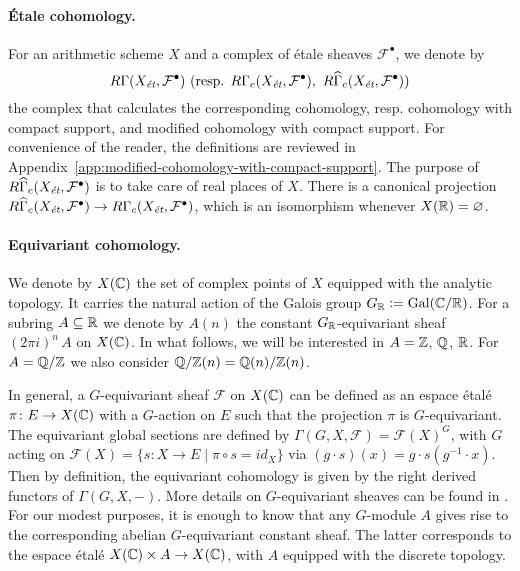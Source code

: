 \documentclass{article}
\numberwithin{equation}{section}
\begin{document}
\paragraph{Étale cohomology.}
For an arithmetic scheme $X$ and a complex of étale sheaves
$\mathcal{F}^\bullet$, we denote by
\[ R\Gamma (X_\et, \mathcal{F}^\bullet) ~
\text{(resp. }R\Gamma_c (X_\et, \mathcal{F}^\bullet), ~
R\widehat{\Gamma}_c (X_\et, \mathcal{F}^\bullet)\text{)} \]
the complex that calculates the corresponding cohomology, resp. cohomology with
compact support, and modified cohomology with compact support. For convenience
of the reader, the definitions are reviewed in
Appendix~\ref{app:modified-cohomology-with-compact-support}. The purpose of
$R\widehat{\Gamma}_c (X_\et, \mathcal{F}^\bullet)$ is to take care of real
places of $X$. There is a canonical projection
$R\widehat{\Gamma}_c (X_\et, \mathcal{F}^\bullet) \to R\Gamma_c (X_\et, \mathcal{F}^\bullet)$,
which is an isomorphism whenever $X (\RR) = \emptyset$.

\paragraph{Equivariant cohomology.}
We denote by $X (\CC)$ the set of complex points of $X$ equipped with the
analytic topology. It carries the natural action of the Galois group
$G_\RR \dfn \Gal (\CC/\RR)$. For a subring $A \subseteq \RR$ we denote by
$A (n)$ the constant $G_\RR$-equivariant sheaf $(2\pi i)^n \, A$ on
$X (\CC)$. In what follows, we will be interested in $A = \ZZ$, $\QQ$, $\RR$.
For $A = \QQ/\ZZ$ we also consider $\QQ/\ZZ (n) = \QQ (n)/\ZZ (n)$.

In general, a $G$-equivariant sheaf $\mathcal{F}$ on $X (\CC)$ can be defined as
an espace étalé $\pi\colon E\to X (\CC)$ with a $G$-action on $E$ such that the
projection $\pi$ is $G$-equivariant. The equivariant global sections are defined
by $\Gamma (G,X,\mathcal{F}) = \mathcal{F} (X)^G$, with $G$ acting on
$\mathcal{F} (X) = \{ s\colon X\to E \mid \pi\circ s = id_X \}$ via
$(g\cdot s) (x) = g\cdot s (g^{-1}\cdot x)$. Then by definition, the equivariant
cohomology is given by the right derived functors of $\Gamma (G,X,-)$. More
details on $G$-equivariant sheaves can be found in
\cite[Chapitre~2]{Morin-these}. For our modest purposes, it is enough to know
that any $G$-module $A$ gives rise to the corresponding abelian $G$-equivariant
constant sheaf. The latter corresponds to the espace étalé
$X (\CC)\times A \to X (\CC)$, with $A$ equipped with the discrete topology.
\end{document}
